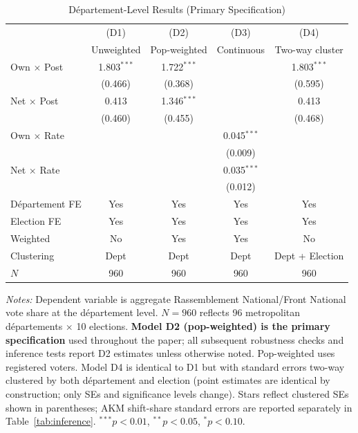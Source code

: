 \documentclass[12pt]{article}
\newcommand{\rn}{Rassemblement National}
\newcommand{\fn}{Front National}
\newcommand{\dept}{d\'{e}partement}
\newcommand{\depts}{d\'{e}partements}
\begin{document}
\begin{table}[H]
\centering
\caption{D\'{e}partement-Level Results (Primary Specification)}
\label{tab:dept}
\begin{threeparttable}
\begin{tabular}{@{}lcccc@{}}
\toprule
 & (D1) & (D2) & (D3) & (D4) \\
 & Unweighted & Pop-weighted & Continuous & Two-way cluster \\
\midrule
Own $\times$ Post & 1.803$^{***}$ & 1.722$^{***}$ & & 1.803$^{***}$ \\
 & (0.466) & (0.368) & & (0.595) \\[3pt]
Net $\times$ Post & 0.413 & 1.346$^{***}$ & & 0.413 \\
 & (0.460) & (0.455) & & (0.468) \\[3pt]
Own $\times$ Rate & & & 0.045$^{***}$ & \\
 & & & (0.009) & \\[3pt]
Net $\times$ Rate & & & 0.035$^{***}$ & \\
 & & & (0.012) & \\[3pt]
\midrule
D\'{e}partement FE & Yes & Yes & Yes & Yes \\
Election FE & Yes & Yes & Yes & Yes \\
Weighted & No & Yes & Yes & No \\
Clustering & Dept & Dept & Dept & Dept + Election \\
$N$ & 960 & 960 & 960 & 960 \\
\bottomrule
\end{tabular}
\begin{tablenotes}
\small
\item \textit{Notes:} Dependent variable is aggregate \rn{}/\fn{} vote share at the \dept{} level. $N = 960$ reflects 96 metropolitan \depts{} $\times$ 10 elections. \textbf{Model D2 (pop-weighted) is the primary specification} used throughout the paper; all subsequent robustness checks and inference tests report D2 estimates unless otherwise noted. Pop-weighted uses registered voters. Model D4 is identical to D1 but with standard errors two-way clustered by both \dept{} and election (point estimates are identical by construction; only SEs and significance levels change). Stars reflect clustered SEs shown in parentheses; AKM shift-share standard errors are reported separately in Table~\ref{tab:inference}. $^{***}p<0.01$, $^{**}p<0.05$, $^{*}p<0.10$.
\end{tablenotes}
\end{threeparttable}
\end{table}
\end{document}
